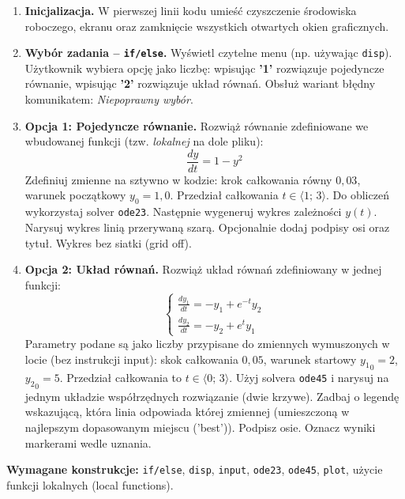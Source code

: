 \documentclass[a4paper,11pt]{article}
\begin{document}
\begin{enumerate}[leftmargin=*, label=\textbf{\arabic*.}, itemsep=2pt]

  \item \textbf{Inicjalizacja.}
    W pierwszej linii kodu umieść czyszczenie środowiska roboczego, ekranu oraz zamknięcie wszystkich otwartych okien graficznych.

  \item \textbf{Wybór zadania -- \texttt{if/else}.}
    Wyświetl czytelne menu (np. używając \texttt{disp}). Użytkownik wybiera opcję jako liczbę: wpisując \textbf{'1'} rozwiązuje pojedyncze równanie, wpisując \textbf{'2'} rozwiązuje układ równań. Obsłuż wariant błędny komunikatem: \textit{Niepoprawny wybór}.

  \item \textbf{Opcja 1: Pojedyncze równanie.}
    Rozwiąż równanie zdefiniowane we wbudowanej funkcji (tzw. \textit{lokalnej} na dole pliku):
    \[ \frac{dy}{dt} = 1 - y^2 \]
    Zdefiniuj zmienne na sztywno w kodzie: krok całkowania równy $0{,}03$, warunek początkowy $y_0 = 1{,}0$. Przedział całkowania $t \in \langle 1;\,3 \rangle$.
    Do obliczeń wykorzystaj solver \texttt{ode23}. Następnie wygeneruj wykres zależności $y(t)$. Narysuj wykres linią przerywaną szarą. Opcjonalnie dodaj podpisy osi oraz tytuł. Wykres bez siatki (grid off).

  \item \textbf{Opcja 2: Układ równań.}
    Rozwiąż układ równań zdefiniowany w jednej funkcji:\\[-0.5em]
    \[
    \begin{cases}
      \frac{dy_1}{dt} = -y_1 + e^{-t}y_2 \\
      \frac{dy_2}{dt} = -y_2 + e^{t}y_1
    \end{cases}
    \]
    Parametry podane są jako liczby przypisane do zmiennych wymuszonych w locie (bez instrukcji input): skok całkowania $0{,}05$, warunek startowy $ {y_1}_{0} = 2 $, $ {y_2}_{0} = 5 $. Przedział całkowania to $t \in \langle 0;\,3 \rangle$.
    Użyj solvera \texttt{ode45} i narysuj na jednym układzie współrzędnych rozwiązanie (dwie krzywe). Zadbaj o legendę wskazującą, która linia odpowiada której zmiennej (umieszczoną w najlepszym dopasowanym miejscu ('best')). Podpisz osie. Oznacz wyniki markerami wedle uznania.

\end{enumerate}

\vspace{0.3cm}
\begin{ramka}
\textbf{Wymagane konstrukcje:}
\texttt{if/else}, \texttt{disp}, \texttt{input}, \texttt{ode23}, \texttt{ode45}, \texttt{plot}, użycie funkcji lokalnych (local functions).
\end{ramka}
\end{document}
